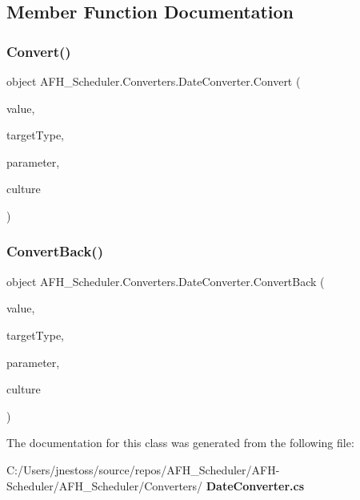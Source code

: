 \subsection{Member Function Documentation}
\mbox{\label{class_a_f_h___scheduler_1_1_converters_1_1_date_converter_a41aa14f607ff873dbd0883b1b92b253f}} 
\subsubsection{Convert()}
{\footnotesize\ttfamily object A\+F\+H\+\_\+\+Scheduler.\+Converters.\+Date\+Converter.\+Convert (\begin{DoxyParamCaption}\item[{object}]{value,  }\item[{Type}]{target\+Type,  }\item[{object}]{parameter,  }\item[{Culture\+Info}]{culture }\end{DoxyParamCaption})}

\mbox{\label{class_a_f_h___scheduler_1_1_converters_1_1_date_converter_a7fd56cb248c4cec7e1004c52da3a2e2f}} 
\subsubsection{ConvertBack()}
{\footnotesize\ttfamily object A\+F\+H\+\_\+\+Scheduler.\+Converters.\+Date\+Converter.\+Convert\+Back (\begin{DoxyParamCaption}\item[{object}]{value,  }\item[{Type}]{target\+Type,  }\item[{object}]{parameter,  }\item[{Culture\+Info}]{culture }\end{DoxyParamCaption})}



The documentation for this class was generated from the following file\+:\begin{DoxyCompactItemize}
\item 
C\+:/\+Users/jnestoss/source/repos/\+A\+F\+H\+\_\+\+Scheduler/\+A\+F\+H-\/\+Scheduler/\+A\+F\+H\+\_\+\+Scheduler/\+Converters/\textbf{ Date\+Converter.\+cs}\end{DoxyCompactItemize}
